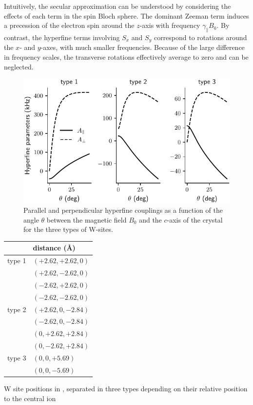 Intuitively, the secular approximation can be understood by considering the effects of each term in the \Er spin Bloch sphere. The dominant Zeeman term induces a precession of the electron spin around the $z$-axis with frequency $\gamma_\parallel B_0$. By contrast, the hyperfine terms involving $S_x$ and $S_y$ correspond to rotations around the $x$- and $y$-axes, with much smaller frequencies. Because of the large difference in frequency scales, the transverse rotations effectively average to zero and can be neglected.

\begin{figure}
    \includegraphics{chapter2/figures/hyperfine_tensor_vs_angle.pdf}
    \caption[Hyperfine coupling parameter]{Parallel and perpendicular hyperfine couplings as a function of the angle $\theta$ between the magnetic field $B_0$ and the $c$-axis of the crystal for the three types of W-sites.}
\end{figure}


\begin{margintable}[]
\begin{tabular}{l|l}
       & distance (\AA) \\ \hline
type 1 & $(+2.62, +2.62,  0) $           \\
       & $(+2.62, -2.62,  0)  $          \\
       & $(-2.62, +2.62,  0)$            \\
       & $(-2.62, -2.62,  0)$            \\ \hline
type 2 & $(+2.62,  0, -2.84)$            \\
       & $(-2.62,  0, -2.84)$            \\
       & $(0, +2.62, +2.84)$             \\
       & $(0, -2.62, +2.84)$             \\ \hline
type 3 & $(0, 0, +5.69)$                 \\
       & $(0, 0, -5.69)$                
\end{tabular}
\caption[\W atomic positions]{W site positions in \Ca, separated in three types depending on their relative position to the central \Er ion}
\end{margintable}

